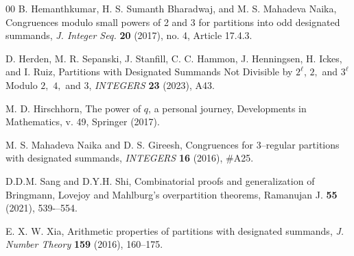 \documentclass{amsart}
\begin{document}
\begin{thebibliography}{00}
B. Hemanthkumar,  H. S. Sumanth Bharadwaj, and M. S. Mahadeva Naika, Congruences modulo small powers of 2 and 3 for partitions into odd designated summands, {\it J. Integer Seq.} {\bf 20} (2017), no. 4, Article 17.4.3.

 D. Herden, M. R. Sepanski, J. Stanfill, C. C. Hammon, J. Henningsen, H. Ickes, and I. Ruiz, Partitions with Designated Summands Not Divisible by $2^\ell$, $2,$ and $3^\ell$ Modulo $2,$ $4,$ and $3$, {\it INTEGERS} {\bf 23} (2023), A43.


 M. D. Hirschhorn, {The power of $q$, a personal journey}, Developments in Mathematics, v. 49, Springer (2017).

M. S. Mahadeva Naika and D. S. Gireesh, Congruences for 3--regular partitions with designated summands, {\it INTEGERS} {\bf 16} (2016), \#A25.  

 D.D.M. Sang and D.Y.H. Shi, Combinatorial proofs and generalization of Bringmann, Lovejoy and Mahlburg’s overpartition theorems, Ramanujan J. {\bf 55} (2021), 539-–554.

E. X. W. Xia, Arithmetic properties of partitions with designated summands, {\it J. Number Theory} {\bf 159} (2016), 160--175.  

\end{thebibliography}
\end{document}

